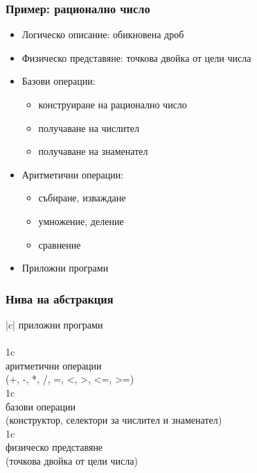\documentclass{beamer}
\begin{document}
\begin{frame}[<+->]
  \frametitle{Пример: рационално число}

  \begin{itemize}
  \item Логическо описание: обикновена дроб
  \item Физическо представяне: точкова двойка от цели числа
  \item Базови операции:
    \begin{itemize}[<.->]
    \item конструиране на рационално число
    \item получаване на числител
    \item получаване на знаменател
    \end{itemize}
  \item Аритметични операции:
    \begin{itemize}[<.->]
    \item събиране, изваждане
    \item умножение, деление
    \item сравнение
    \end{itemize}
  \item Приложни програми
  \end{itemize}
\end{frame}


\begin{frame}
  \frametitle{Нива на абстракция}

  \renewcommand{\bua}{\bigg\uparrow}

  \begin{center}
    \begin{tabular}{|c|}
      \hline
      приложни програми\\
      \\
      \hline
      \multicolumn 1c\bua\\
      \hline
      аритметични операции\\
      (+, -, *, /, =, <, >, <=, >=)\\
      \hline
      \multicolumn 1c\bua\\
      \hline
      базови операции\\
      (конструктор, селектори за числител и знаменател)\\
      \hline
      \multicolumn 1c\bua\\
      \hline
      физическо представяне\\
      (точкова двойка от цели числа)\\
      \hline
    \end{tabular}
  \end{center}
\end{frame}
\end{document}
